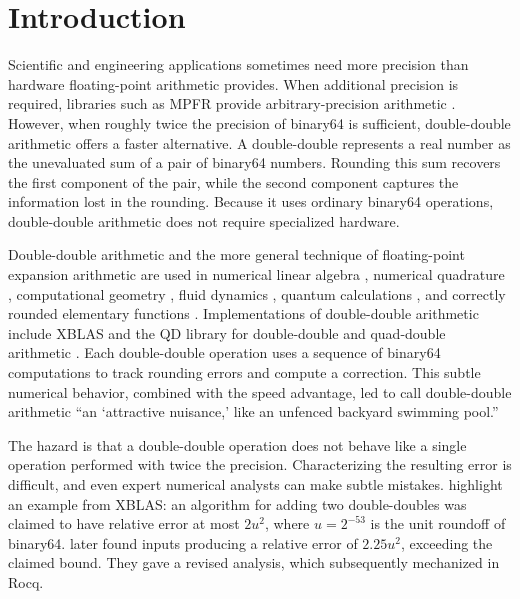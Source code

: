 \section{Introduction}
\label{sec:intro}

Scientific and engineering applications sometimes need more precision than
hardware floating-point arithmetic provides. When additional precision is
required, libraries such as MPFR provide arbitrary-precision arithmetic
\citep{Fousse2007}. However, when roughly twice the precision of binary64 is
sufficient, double-double arithmetic offers a faster alternative. A
double-double represents a real number as the unevaluated sum of a pair of 
binary64 numbers. Rounding this sum recovers the first component of the pair, 
while the second component captures the information lost in the rounding. 
Because it uses ordinary binary64 operations, double-double arithmetic
does not require specialized hardware.

Double-double arithmetic and the more general technique of floating-point
expansion arithmetic are used in numerical linear algebra
\citep{Li2002,Evstigneev2022}, numerical quadrature
\citep{BaileyBorwein2012}, computational geometry \citep{Shewchuk1997}, fluid
dynamics \citep{BaileyKrasnyPelz1993,HeDing2001}, quantum calculations
\citep{Frolov2000,FrolovBailey2003,Aoyama2015}, and correctly rounded
elementary functions \citep{CRLibm2006,CoreMath2022}. Implementations of 
double-double arithmetic include XBLAS and the QD library for double-double and 
quad-double arithmetic \citep{Li2002,Hida2001,QD}. Each double-double operation 
uses a sequence of binary64 computations to track rounding errors and compute a 
correction. This subtle numerical behavior, combined with the speed advantage, 
led \citet{Li2002} to call double-double arithmetic ``an `attractive nuisance,' 
like an unfenced backyard swimming pool.''

The hazard is that a double-double operation does not behave like a single
operation performed with twice the precision. Characterizing the resulting
error is difficult, and even expert numerical analysts can make subtle
mistakes. \citet{Zhang2025} highlight an example from XBLAS: an algorithm for
adding two double-doubles was claimed to have relative error at most $2u^2$,
where $u=2^{-53}$ is the unit roundoff of binary64. \citet{Joldes2017} later
found inputs producing a relative error of $2.25u^2$, exceeding the claimed
bound. They gave a revised analysis, which \citet{Rideau2022} subsequently
mechanized in Rocq.

